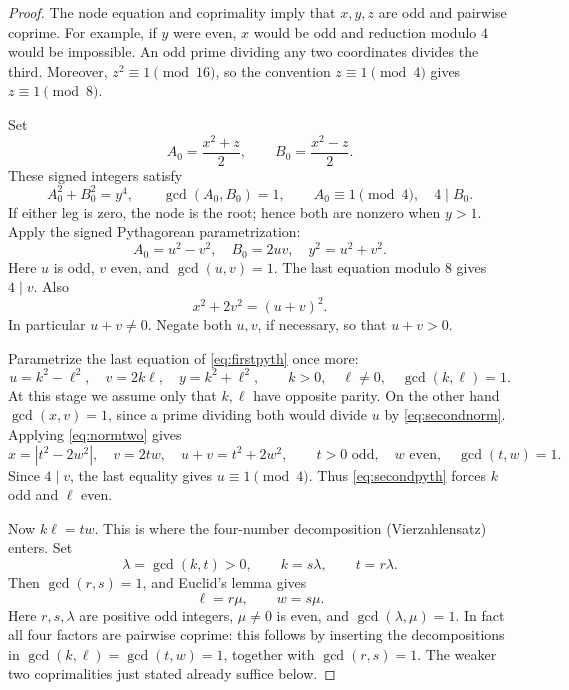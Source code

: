 \documentclass[11pt,a4paper]{article}
\theoremstyle{definition}
\begin{document}
\begin{proof}
The node equation and coprimality imply that \(x,y,z\) are odd and
pairwise coprime. For example, if \(y\) were even, \(x\) would be
odd and reduction modulo \(4\) would be impossible. An odd prime
dividing any two coordinates divides the third. Moreover,
\(z^2\equiv1\pmod{16}\), so the convention \(z\equiv1\pmod4\)
gives \(z\equiv1\pmod8\).

Set
\[
 A_0=\frac{x^2+z}{2},\qquad B_0=\frac{x^2-z}{2}.
\]
These signed integers satisfy
\[
 A_0^2+B_0^2=y^4,\qquad \gcd(A_0,B_0)=1,
 \qquad A_0\equiv1\pmod4,\quad 4\mid B_0.
\]
If either leg is zero, the node is the root; hence both are nonzero
when \(y>1\). Apply the signed Pythagorean parametrization:
\begin{equation}\label{eq:firstpyth}
 A_0=u^2-v^2,\quad B_0=2uv,\quad y^2=u^2+v^2.
\end{equation}
Here \(u\) is odd, \(v\) even, and \(\gcd(u,v)=1\).
The last equation modulo \(8\) gives \(4\mid v\).
Also
\begin{equation}\label{eq:secondnorm}
 x^2+2v^2=(u+v)^2.
\end{equation}
In particular \(u+v\ne0\). Negate both \(u,v\), if necessary, so
that \(u+v>0\).

Parametrize the last equation of \eqref{eq:firstpyth} once more:
\begin{equation}\label{eq:secondpyth}
 u=k^2-\ell^2,\quad v=2k\ell,\quad y=k^2+\ell^2,
 \qquad k>0,\quad \ell\ne0,\quad \gcd(k,\ell)=1.
\end{equation}
At this stage we assume only that \(k,\ell\) have opposite parity.
On the other hand \(\gcd(x,v)=1\), since a prime dividing both
would divide \(u\) by \eqref{eq:secondnorm}. Applying
\eqref{eq:normtwo} gives
\begin{equation}\label{eq:thirdparam}
 x=|t^2-2w^2|,\quad v=2tw,\quad u+v=t^2+2w^2,
 \qquad t>0\text{ odd},\quad w\text{ even},\quad \gcd(t,w)=1.
\end{equation}
Since \(4\mid v\), the last equality gives \(u\equiv1\pmod4\).
Thus \eqref{eq:secondpyth} forces \(k\) odd and \(\ell\) even.

Now \(k\ell=tw\). This is where the four-number decomposition
(Vierzahlensatz) enters. Set
\[
 \lambda=\gcd(k,t)>0,\qquad k=s\lambda,\qquad t=r\lambda.
\]
Then \(\gcd(r,s)=1\), and Euclid's lemma gives
\[
 \ell=r\mu,\qquad w=s\mu.
\]
Here \(r,s,\lambda\) are positive odd integers, \(\mu\ne0\) is
even, and \(\gcd(\lambda,\mu)=1\). In fact all four factors are
pairwise coprime: this follows by inserting the decompositions in
\(\gcd(k,\ell)=\gcd(t,w)=1\), together with \(\gcd(r,s)=1\).
The weaker two coprimalities just stated already suffice below.


\end{proof}
\end{document}
